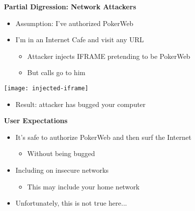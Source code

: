 \documentclass[helvetica]{seminar}
\newcommand{\heading}[1]{%
  \begin{center} 
    \large\bf 
    #1 
  \end{center} 
  \vspace{.4 in}}
\begin{document}
\begin{slide}
\heading{Partial Digression: Network Attackers}

\vspace{-.25in}
\begin{itemize}
\item Assumption: I've authorized PokerWeb
\item I'm in an Internet Cafe and visit any URL
  \begin{itemize}
  \item Attacker injects IFRAME pretending to be PokerWeb
  \item But calls go to him
  \end{itemize}
\end{itemize}

\texttt{[image: injected-iframe]}

\begin{itemize}
\item Result: attacker has bugged your computer
\end{itemize}
\end{slide}


\begin{slide}
\heading{User Expectations}

\begin{itemize}
\item It's safe to authorize PokerWeb and then surf the Internet
  \begin{itemize}
  \item Without being bugged
  \end{itemize}

\item Including on insecure networks
  \begin{itemize}
  \item This may include your home network
  \end{itemize}

\item Unfortunately, this is not true here...
\end{itemize}
\end{slide}
\end{document}
